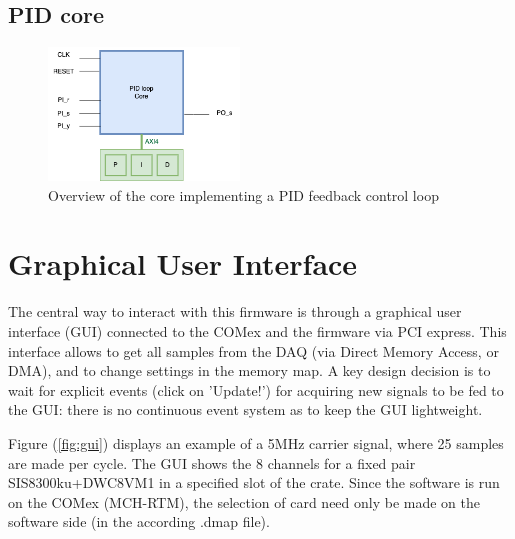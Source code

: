 \documentclass[12pt]{amsart}
\begin{document}
\subsection{PID core}


\begin{figure}[htbp] %
   \centering
   \includegraphics[width=2in]{im/PIDcore.png} 
   \caption{Overview of the core implementing a PID feedback control loop}
   \label{fig:pidcore}
\end{figure}




















\newpage
{}
\section{Graphical User Interface}

The central way to interact with this firmware is through a graphical user interface (GUI) connected to the COMex and the firmware
via PCI express. This interface allows to get all samples from the DAQ (via Direct Memory Access, or DMA), and to change settings in the memory map.
A key design decision is to wait for explicit events (click on 'Update!') for acquiring new signals to be fed to the GUI:
there is no continuous event system as to keep the GUI lightweight.

Figure (\ref{fig:gui}) displays an example of a 5MHz carrier signal, where 25 samples are made per cycle.
The GUI shows the 8 channels for a fixed pair SIS8300ku+DWC8VM1 in a specified slot of the crate.
Since the software is run on the COMex (MCH-RTM), the selection of card need only be made on the software side (in the according .dmap file).
\end{document}
